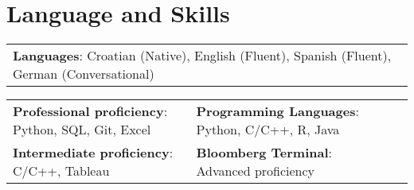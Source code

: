 \documentclass[letterpaper,10pt]{article}
\begin{document}
%
\section{Language and Skills}
\begin{center}
\begin{tabularx}{0.96\textwidth} { 
  >{\raggedright\arraybackslash}X
}
  \small{\textbf{Languages}: Croatian (Native), English (Fluent), Spanish (Fluent), German (Conversational)}
\end{tabularx}
\end{center}

\begin{center}
\begin{tabularx}{0.96\textwidth} { 
  >{\raggedright\arraybackslash}X 
   >{\raggedright\arraybackslash}X 
   >{\raggedright\arraybackslash}X 
   >{\raggedright\arraybackslash}X
}
\small{\textbf{Professional proficiency}: Python, SQL, Git, Excel} & \small{\hspace{3pt}\textbf{Programming Languages}: Python, C/C++, R, Java} \\
\small{\textbf{Intermediate proficiency}: C/C++, Tableau} & \small{\hspace{3pt}\textbf{Bloomberg Terminal}: Advanced proficiency} \\
\end{tabularx}
\end{center}


\end{document}
